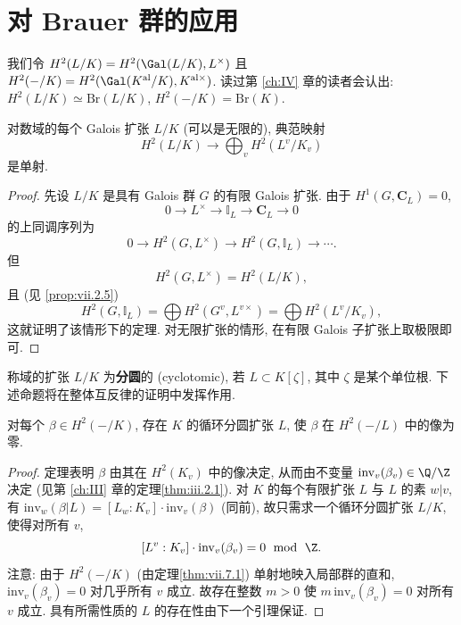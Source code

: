 \section{对 Brauer 群的应用}\label{sec:VII.7}

我们令 $H^{2}(L/K)=H^{2}(\Gal(L/K),L^{\times})$ 且 $H^{2}(-/K)=H^{2}(\Gal(K^{\mathrm{al}}/K),K^{\mathrm{al}\times})$. 读过第 \ref{ch:IV} 章的读者会认出: $H^{2}(L/K)\simeq\mathrm{Br}(L/K)$, $H^{2}(-/K)=\mathrm{Br}(K)$.

\begin{theorem}\label{thm:vii.7.1}
对数域的每个 Galois 扩张 $L/K$ (可以是无限的), 典范映射
\[
H^{2}(L/K)\to\bigoplus_{v}H^{2}(L^{v}/K_{v})
\]
是单射.
\end{theorem}

\begin{proof}
先设 $L/K$ 是具有 Galois 群 $G$ 的有限 Galois 扩张. 由于 $H^{1}(G,\mathbf{C}_{L})=0$,
\[
0\to L^{\times}\to\mathbb{I}_{L}\to\mathbf{C}_{L}\to 0
\]
的上同调序列为
\[
0\to H^{2}(G,L^{\times})\to H^{2}(G,\mathbb{I}_{L})\to\cdots.
\]
但
\[
H^{2}(G,L^{\times})=H^{2}(L/K),
\]
且 (见 \ref{prop:vii.2.5})
\[
H^{2}(G,\mathbb{I}_{L})=\bigoplus H^{2}(G^{v},L^{v\times})=\bigoplus H^{2}(L^{v}/K_{v}),
\]
这就证明了该情形下的定理. 对无限扩张的情形, 在有限 Galois 子扩张上取极限即可.
\end{proof}

称域的扩张 $L/K$ 为\textbf{分圆}的 (cyclotomic), 若 $L\subset K[\zeta]$, 其中 $\zeta$ 是某个单位根. 下述命题将在整体互反律的证明中发挥作用.

\begin{proposition}\label{prop:vii.7.2}
对每个 $\beta\in H^{2}(-/K)$, 存在 $K$ 的循环分圆扩张 $L$, 使 $\beta$ 在 $H^{2}(-/L)$ 中的像为零.
\end{proposition}

\begin{proof}
定理表明 $\beta$ 由其在 $H^{2}(K_v)$ 中的像决定, 从而由不变量 $\mathrm{inv}_{v}(\beta_{v})\in\Q/\Z$ 决定 (见第 \ref{ch:III} 章的定理\ref{thm:iii.2.1}). 对 $K$ 的每个有限扩张 $L$ 与 $L$ 的素 $w|v$, 有 $\mathrm{inv}_{w}(\beta|L)=[L_{w}:K_{v}]\cdot\mathrm{inv}_{v}(\beta)$ (同前), 故只需求一个循环分圆扩张 $L/K$, 使得对所有 $v$,
\[
[L^{v}:K_{v}]\cdot\operatorname{inv}_{v}(\beta_{v})=0\ \bmod\ \Z.
\]
注意: 由于 $H^{2}(-/K)$ (由定理\ref{thm:vii.7.1}) 单射地映入局部群的直和, $\mathrm{inv}_{v}(\beta_{v})=0$ 对几乎所有 $v$ 成立. 故存在整数 $m>0$ 使 $m\,\mathrm{inv}_{v}(\beta_{v})=0$ 对所有 $v$ 成立. 具有所需性质的 $L$ 的存在性由下一个引理保证.
\end{proof}

